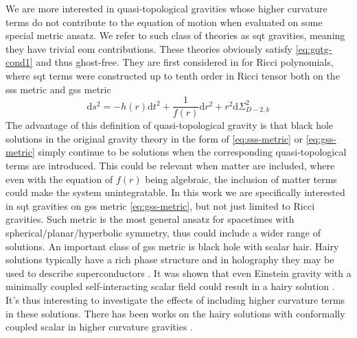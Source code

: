 \documentclass[a4paper,11pt]{article}
\newcommand{\dd}{{\mathrm d}}
\begin{document}
We are more interested in quasi-topological gravities whose higher curvature terms do not contribute to the equation of motion when evaluated on some special metric ansatz. We refer to such class of theories as \ac{sqt} gravities, meaning they have trivial \acf{eom} contributions. These theories obviously satisfy \eqref{eq:gqtg-cond1} and thus ghost-free. They are first considered in \cite{lyz1} for Ricci polynomials, where \ac{sqt} terms were constructed up to tenth order in Ricci tensor both on the \ac{sss} metric and \ac{gss} metric
\begin{equation}\label{eq:gss-metric}
    \dd s^2 = -h(r) \dd t^2 + \frac{1}{f(r)} \dd r^2 + r^2\dd\Sigma_{D-2, k}^2
\end{equation}
The advantage of this definition of quasi-topological gravity is that black hole solutions in the original gravity theory in the form of \eqref{eq:sss-metric} or \eqref{eq:gss-metric} simply continue to be solutions when the corresponding quasi-topological terms are introduced. This could be relevant when matter are included, where even with the equation of $f(r)$ being algebraic, the inclusion of matter terms could make the system unintegratable. In this work we are specifically interested in \ac{sqt} gravities on \ac{gss} metric \eqref{eq:gss-metric}, but not just limited to Ricci gravities. Such metric is the most general ansatz for spacetimes with spherical/planar/hyperbolic symmetry, thus could include a wider range of solutions. An important class of \ac{gss} metric is black hole with scalar hair. Hairy solutions typically have a rich phase structure and in holography they may be used to describe superconductors \cite{building-holographic-superconductor, holographic-superconductor}. It was shown that even Einstein gravity with a minimally coupled self-interacting scalar field could result in a hairy solution \cite{mtz-bh}. It's thus interesting to investigate the effects of including higher curvature terms in these solutions. There has been works on the hairy solutions with conformally coupled scalar in higher curvature gravities \cite{hairy-bh-in-qtg, quadratic-hairy-bh}.
\end{document}
